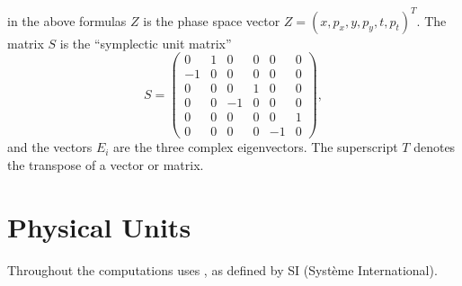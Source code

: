 in the above formulas $Z$ is the phase space vector
$Z = (x, p_x, y, p_y, t, p_t)^T$.
The matrix $S$ is the ``symplectic unit matrix''
\[
S = \left( \begin{array}{cccccc}
    0 & 1 & 0 & 0 & 0 & 0 \\
    -1 & 0 & 0 & 0 & 0 & 0 \\
    0 & 0 & 0 & 1 & 0 & 0 \\
    0 & 0 &-1 & 0 & 0 & 0 \\
    0 & 0 & 0 & 0 & 0 & 1 \\
    0 & 0 & 0 & 0 &-1 & 0
  \end{array} \right ),
\]
and the vectors $E_i$ are the three complex eigenvectors.
The superscript $T$ denotes the transpose of a vector or matrix.

\section{Physical Units}
\label{sec:units}
Throughout the computations \opal uses ,
as defined by SI (Syst\`eme International).

